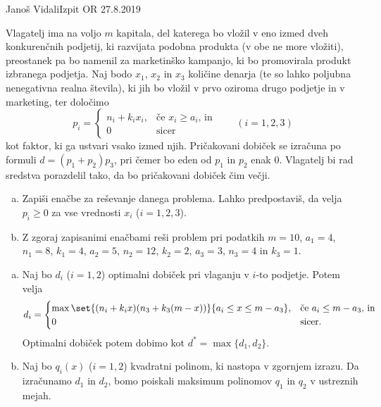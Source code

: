 \begin{naloga}{Janoš Vidali}{Izpit OR 27.8.2019}
\begin{vprasanje}
Vlagatelj ima na voljo $m$ kapitala,
del katerega bo vložil v eno izmed dveh konkurenčnih podjetij,
ki razvijata podobna produkta
(v obe ne more vložiti),
preostanek pa bo namenil za marketinško kampanjo,
ki bo promovirala produkt izbranega podjetja.
Naj bodo $x_1$, $x_2$ in $x_3$ količine denarja
(te so lahko poljubna nenegativna realna števila),
ki jih bo vložil v prvo oziroma drugo podjetje in v marketing,
ter določimo
$$
p_i = \begin{cases}
n_i + k_i x_i, & \text{če $x_i \ge a_i$, in} \\
0 & \text{sicer}
\end{cases}
\qquad (i = 1, 2, 3)
$$
kot faktor,
ki ga ustvari vsako izmed njih.
Pričakovani dobiček se izračuna po formuli $d = (p_1 + p_2) p_3$,
pri čemer bo eden od $p_1$ in $p_2$ enak $0$.
Vlagatelj bi rad sredstva porazdelil tako,
da bo pričakovani dobiček čim večji.

\begin{enumerate}[(a)]
\item Zapiši enačbe za reševanje danega problema.
Lahko predpostaviš,
da velja $p_i \ge 0$ za vse vrednosti $x_i$ ($i = 1, 2, 3$).

\item Z zgoraj zapisanimi enačbami reši problem pri podatkih
$m = 10$, $a_1 = 4$, $n_1 = 8$, $k_1 = 4$, $a_2 = 5$, $n_2 = 12$, $k_2 = 2$,
$a_3 = 3$, $n_3 = 4$ in $k_3 = 1$.
\end{enumerate}
\end{vprasanje}

\begin{odgovor}
\begin{enumerate}[(a)]
\item Naj bo $d_i$ ($i = 1, 2$) optimalni dobiček
pri vlaganju v $i$-to podjetje.
Potem velja
$$
d_i = \begin{cases}
\max\set{(n_i + k_i x)(n_3 + k_3 (m-x))}{a_i \le x \le m-a_3},
& \text{če $a_i \le m-a_3$, in} \\
0 & \text{sicer.}
\end{cases}
$$
Optimalni dobiček potem dobimo kot $d^* = \max\{d_1, d_2\}$.

\item Naj bo $q_i(x)$ ($i = 1, 2$) kvadratni polinom,
ki nastopa v zgornjem izrazu.
Da izračunamo $d_1$ in $d_2$,
bomo poiskali maksimum polinomov $q_1$ in $q_2$
v ustreznih mejah.


\end{enumerate}
\end{odgovor}
\end{naloga}
